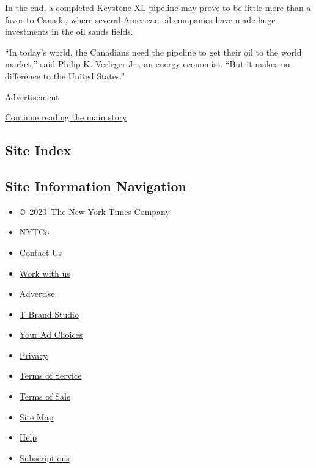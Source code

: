 In the end, a completed Keystone XL pipeline may prove to be little more
than a favor to Canada, where several American oil companies have made
huge investments in the oil sands fields.

``In today's world, the Canadians need the pipeline to get their oil to
the world market,'' said Philip K. Verleger Jr., an energy economist.
``But it makes no difference to the United States.''

Advertisement

\protect\hyperlink{after-bottom}{Continue reading the main story}

\hypertarget{site-index}{%
\subsection{Site Index}\label{site-index}}

\hypertarget{site-information-navigation}{%
\subsection{Site Information
Navigation}\label{site-information-navigation}}

\begin{itemize}
\tightlist
\item
  \href{https://help.nytimes.com/hc/en-us/articles/115014792127-Copyright-notice}{©~2020~The
  New York Times Company}
\end{itemize}

\begin{itemize}
\tightlist
\item
  \href{https://www.nytco.com/}{NYTCo}
\item
  \href{https://help.nytimes.com/hc/en-us/articles/115015385887-Contact-Us}{Contact
  Us}
\item
  \href{https://www.nytco.com/careers/}{Work with us}
\item
  \href{https://nytmediakit.com/}{Advertise}
\item
  \href{http://www.tbrandstudio.com/}{T Brand Studio}
\item
  \href{https://www.nytimes.com/privacy/cookie-policy\#how-do-i-manage-trackers}{Your
  Ad Choices}
\item
  \href{https://www.nytimes.com/privacy}{Privacy}
\item
  \href{https://help.nytimes.com/hc/en-us/articles/115014893428-Terms-of-service}{Terms
  of Service}
\item
  \href{https://help.nytimes.com/hc/en-us/articles/115014893968-Terms-of-sale}{Terms
  of Sale}
\item
  \href{https://spiderbites.nytimes.com}{Site Map}
\item
  \href{https://help.nytimes.com/hc/en-us}{Help}
\item
  \href{https://www.nytimes.com/subscription?campaignId=37WXW}{Subscriptions}
\end{itemize}
